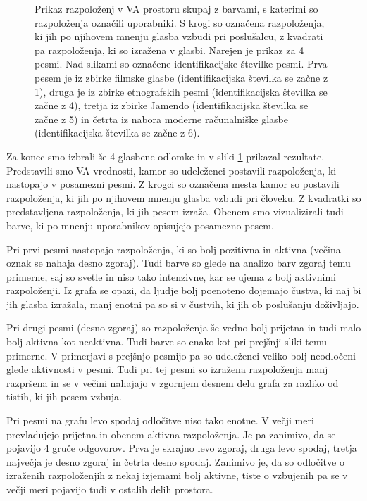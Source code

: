 \documentclass[a4paper, 12pt]{book}
\begin{document}
{\begin{figure}[hbt]
\caption{Prikaz razpoloženj v VA prostoru skupaj z barvami, s katerimi so razpoloženja označili uporabniki. S krogi so označena razpoloženja, ki jih po njihovem mnenju glasba vzbudi pri poslušalcu, z kvadrati pa razpoloženja, ki so izražena v glasbi. Narejen je prikaz za 4 pesmi. Nad slikami so označene identifikacijske številke pesmi. Prva pesem je iz zbirke filmske glasbe (identifikacijska številka se začne z 1), druga je iz zbirke etnografskih pesmi (identifikacijska številka se začne z 4), tretja iz zbirke Jamendo (identifikacijska številka se začne z 5) in četrta iz nabora moderne računalniške glasbe (identifikacijska številka se začne z 6).}
\label{moodmusic}
\end{figure} 

Za konec smo izbrali še 4 glasbene odlomke in v sliki \ref{moodmusic} prikazal rezultate. Predstavili smo VA vrednosti, kamor so udeleženci postavili razpoloženja, ki nastopajo v posamezni pesmi. Z krogci so označena mesta kamor so postavili razpoloženja, ki jih po njihovem mnenju glasba vzbudi pri človeku. Z kvadratki so predstavljena razpoloženja, ki jih pesem izraža. Obenem smo vizualizirali tudi barve, ki po mnenju uporabnikov opisujejo posamezno pesem. 

Pri prvi pesmi nastopajo razpoloženja, ki so bolj pozitivna in aktivna (večina oznak se nahaja desno zgoraj). Tudi barve so glede na analizo barv zgoraj temu primerne, saj so svetle in niso tako intenzivne, kar se ujema z bolj aktivnimi razpoloženji. Iz grafa se opazi, da ljudje bolj poenoteno dojemajo čustva, ki naj bi jih glasba izražala, manj enotni pa so si v čustvih, ki jih ob poslušanju doživljajo. 

Pri drugi pesmi (desno zgoraj) so razpoloženja še vedno bolj prijetna in tudi malo bolj aktivna kot neaktivna. Tudi barve so enako kot pri prejšnji sliki temu primerne. V primerjavi s prejšnjo pesmijo pa so udeleženci veliko bolj neodločeni glede aktivnosti v pesmi. Tudi pri tej pesmi so izražena razpoloženja manj razpršena in se v večini nahajajo v zgornjem desnem delu grafa za razliko od tistih, ki jih pesem vzbuja. 

Pri pesmi na grafu levo spodaj odločitve niso tako enotne. V večji meri prevladujejo prijetna in obenem aktivna razpoloženja. Je pa zanimivo, da se pojavijo 4 gruče odgovorov. Prva je skrajno levo zgoraj, druga levo spodaj, tretja največja je desno zgoraj in četrta desno spodaj. Zanimivo je, da so odločitve o izraženih razpoloženjih z nekaj izjemami bolj aktivne, tiste o vzbujenih pa se v večji meri pojavijo tudi v ostalih delih prostora. 

}
\end{document}
